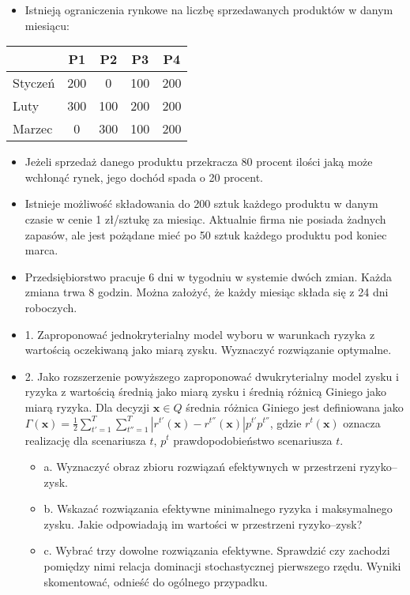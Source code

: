 \documentclass{article}
\begin{document}
\begin{itemize}
\item Istnieją ograniczenia rynkowe na liczbę sprzedawanych produktów w danym miesiącu:
\end{itemize}

\begin{table}[H]
\centering
\begin{tabular}{|l|c|c|c|c|}
\hline
         & P1  & P2  & P3  & P4  \\
\hline
Styczeń & 200 & 0   & 100 & 200 \\
\hline
Luty    & 300 & 100 & 200 & 200 \\
\hline
Marzec  & 0   & 300 & 100 & 200 \\
\hline
\end{tabular}
\end{table}

\begin{itemize}
\item Jeżeli sprzedaż danego produktu przekracza 80 procent ilości jaką może wchłonąć rynek, jego
dochód spada o 20 procent.
\item Istnieje możliwość składowania do 200 sztuk każdego produktu w danym czasie w cenie 1 zł/sztukę za miesiąc. Aktualnie firma nie posiada żadnych zapasów, ale jest pożądane mieć po 50 sztuk każdego produktu pod koniec marca.
\item Przedsiębiorstwo pracuje 6 dni w tygodniu w systemie dwóch zmian. Każda zmiana trwa 8 godzin. Można założyć, że każdy miesiąc składa się z 24 dni roboczych.
\item 1. Zaproponować jednokryterialny model wyboru w warunkach ryzyka z wartością oczekiwaną jako miarą zysku. Wyznaczyć rozwiązanie optymalne.
\item 2. Jako rozszerzenie powyższego zaproponować dwukryterialny model zysku i ryzyka z wartością średnią jako miarą zysku i średnią różnicą Giniego jako miarą ryzyka. Dla decyzji $\mathbf{x} \in Q$ średnia różnica Giniego jest definiowana jako $\Gamma(\mathbf{x}) = \frac{1}{2} \sum_{t'=1}^{T} \sum_{t''=1}^{T} |r^{t'}(\mathbf{x}) - r^{t''}(\mathbf{x})|p^{t'}p^{t''}$, gdzie $r^t(\mathbf{x})$ oznacza realizację dla scenariusza $t$, $p^t$ prawdopodobieństwo scenariusza $t$.
    \begin{itemize}
    \item a. Wyznaczyć obraz zbioru rozwiązań efektywnych w przestrzeni ryzyko–zysk.
    \item b. Wskazać rozwiązania efektywne minimalnego ryzyka i maksymalnego zysku. Jakie odpowiadają im wartości w przestrzeni ryzyko–zysk?
    \item c. Wybrać trzy dowolne rozwiązania efektywne. Sprawdzić czy zachodzi pomiędzy nimi relacja dominacji stochastycznej pierwszego rzędu. Wyniki skomentować, odnieść do ogólnego przypadku.
    \end{itemize}
\end{itemize}
\end{document}
